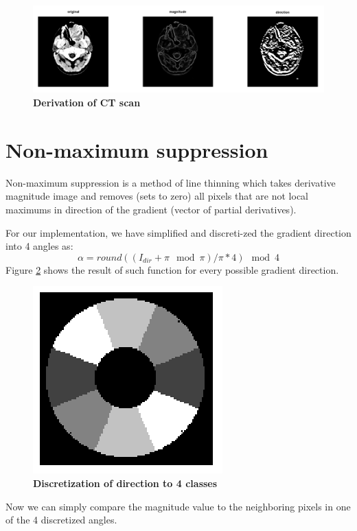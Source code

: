 \documentclass[fleqn,moreauthors,10pt]{ds_report}
\begin{document}
\begin{figure}[h]\centering
	\includegraphics[width=\linewidth]{mag_dir.png}
	\caption{\textbf{Derivation of CT scan}}
	\label{fig:gaussians}
\end{figure}

\section*{Non-maximum suppression}

Non-maximum suppression is a method of line thinning which takes derivative magnitude image and removes (sets to zero) all pixels that are not local maximums in direction of the gradient (vector of partial derivatives).

For our implementation, we have simplified and discreti-zed the gradient direction into 4 angles as: 
\begin{equation}
	\alpha = round((I_{dir} + \pi \mod \pi) / \pi * 4) \mod 4	
\end{equation}
Figure \ref{fig:angle} shows the result of such function for every possible gradient direction.

\begin{figure}[h]\centering
	\includegraphics[width=0.3\linewidth]{angle.png}
	\caption{\textbf{Discretization of direction to 4 classes}}
	\label{fig:angle}
\end{figure}

Now we can simply compare the magnitude value to the neighboring pixels in one of the 4 discretized angles.
\end{document}
